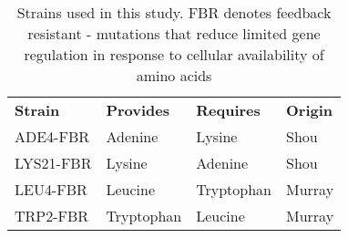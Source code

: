 \begin{table}
\centering
\caption{Strains used in this study. FBR denotes feedback resistant - mutations that reduce limited gene regulation in response to cellular availability of amino acids}
\label{my-label}
\begin{tabular}{llll}
\textbf{Strain} & \textbf{Provides} & \textbf{Requires} & \textbf{Origin} \\
ADE4-FBR        & Adenine           & Lysine            & Shou            \\
LYS21-FBR       & Lysine            & Adenine           & Shou            \\
LEU4-FBR        & Leucine           & Tryptophan        & Murray          \\
TRP2-FBR        & Tryptophan        & Leucine           & Murray         
\end{tabular}

\end{table}